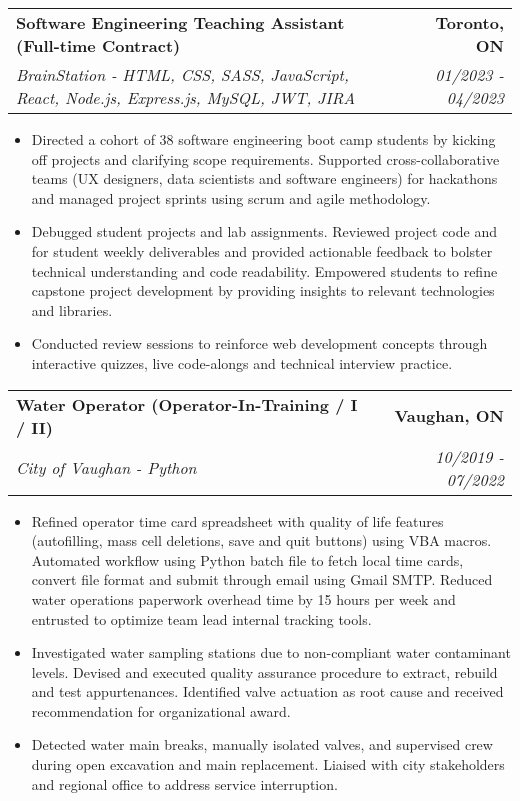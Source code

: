 \documentclass[letterpaper,11pt]{article}
\makeatletter
\newcommand{\resumeItem}[1]{
  \item\small{
    {#1 \vspace{-3pt}}
  }
}
\newcommand{\resumeSubheading}[4]{
  \vspace{-3pt}\item
    \begin{tabular*}{1.0\textwidth}[t]{l@{\extracolsep{\fill}}r}
      \textbf{#1} & \textbf{\small #2} \\
      \textit{\small#3} & \textit{\small #4} \\
    \end{tabular*}\vspace{-7pt}
}
\newcommand{\resumeItemListStart}{\begin{itemize}}
\newcommand{\resumeItemListEnd}{\end{itemize}\vspace{0pt}}
\makeatother
\begin{document}
        \resumeSubheading
        {Software Engineering Teaching Assistant (Full-time Contract)}{Toronto, ON}
            {BrainStation - HTML, CSS, SASS, JavaScript, React, Node.js, Express.js, MySQL, JWT, JIRA}{01/2023 - 04/2023}
            \resumeItemListStart
                \resumeItem{Directed a cohort of 38 software engineering boot camp students by kicking off projects and clarifying scope requirements. Supported cross-collaborative teams (UX designers, data scientists and software engineers) for hackathons and managed project sprints using scrum and agile methodology.}
                \resumeItem{Debugged student projects and lab assignments. Reviewed project code and for student weekly deliverables and provided actionable feedback to bolster technical understanding and code readability. Empowered students to refine capstone project development by providing insights to relevant technologies and libraries.}
                \resumeItem{Conducted review sessions to reinforce web development concepts through interactive quizzes, live code-alongs and technical interview practice.}
            \resumeItemListEnd

        \resumeSubheading
        {Water Operator (Operator-In-Training / I / II)}{Vaughan, ON}
            {City of Vaughan - Python}{10/2019 - 07/2022}
            \resumeItemListStart
                \resumeItem{Refined operator time card spreadsheet with quality of life features (autofilling, mass cell deletions, save and quit buttons) using VBA macros. Automated  workflow using Python batch file to fetch local time cards, convert file format and submit through email using Gmail SMTP. Reduced water operations paperwork overhead time by 15 hours per week and entrusted to optimize team lead internal tracking tools.}
                \resumeItem{Investigated water sampling stations due to non-compliant water contaminant levels. Devised and executed quality assurance procedure to extract, rebuild and test appurtenances. Identified valve actuation as root cause and received recommendation for organizational award.}
                \resumeItem{Detected water main breaks, manually isolated valves, and supervised crew during open excavation and main replacement. Liaised with city stakeholders and regional office to address service interruption.}
            \resumeItemListEnd
\end{document}
